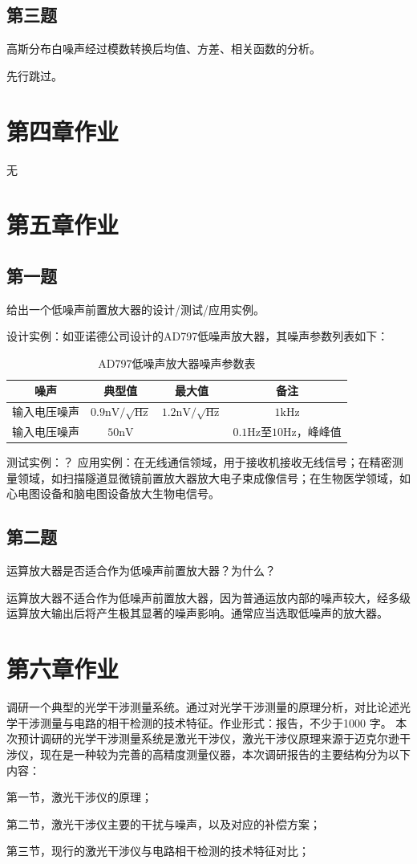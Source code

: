 \documentclass[11pt]{article}
\begin{document}
\subsection{第三题}
{\heiti 高斯分布白噪声经过模数转换后均值、方差、相关函数的分析。}\par
先行跳过。
\section{第四章作业}
无
\section{第五章作业}
\subsection{第一题}
{\heiti 给出一个低噪声前置放大器的设计/测试/应用实例。}\par
设计实例：如亚诺德公司设计的AD797低噪声放大器，其噪声参数列表如下：\par
\begin{table}[H]
  \centering
  \renewcommand{\arraystretch}{1.5}
  \caption{AD797低噪声放大器噪声参数表}
  \begin{tabular}{c|c|c|c}
    \hline
    噪声&典型值&最大值&备注\\\hline
    输入电压噪声&$0.9 \mathrm{nV}/\sqrt{\mathrm{Hz}}$&$1.2\mathrm{nV}/\sqrt{\mathrm{Hz}}$&$1 \mathrm{kHz}$\\\hline
    输入电压噪声&$50 \mathrm{nV}$&&$0.1 \mathrm{Hz}$至$10 \mathrm{Hz}$，峰峰值\\
    \hline
  \end{tabular}
\end{table}
测试实例：？
应用实例：在无线通信领域，用于接收机接收无线信号；在精密测量领域，如扫描隧道显微镜前置放大器放大电子束成像信号；在生物医学领域，如心电图设备和脑电图设备放大生物电信号。\par
\subsection{第二题}
{\heiti 运算放大器是否适合作为低噪声前置放大器？为什么？}\par
运算放大器不适合作为低噪声前置放大器，因为普通运放内部的噪声较大，经多级运算放大输出后将产生极其显著的噪声影响。通常应当选取低噪声的放大器。
\section{第六章作业}
{\heiti 调研一个典型的光学干涉测量系统。通过对光学干涉测量的原理分析，对比论述光学干涉测量与电路的相干检测的技术特征。作业形式：报告，不少于1000 字。}
本次预计调研的光学干涉测量系统是激光干涉仪，激光干涉仪原理来源于迈克尔逊干涉仪，现在是一种较为完善的高精度测量仪器，本次调研报告的主要结构分为以下内容：\par
第一节，激光干涉仪的原理； \par
第二节，激光干涉仪主要的干扰与噪声，以及对应的补偿方案；\par
第三节，现行的激光干涉仪与电路相干检测的技术特征对比；\par
\end{document}
